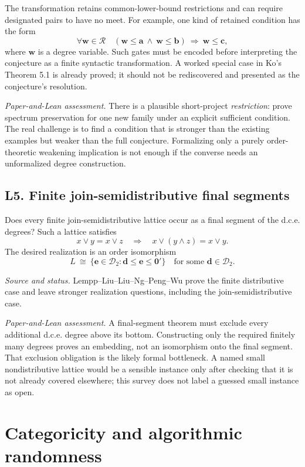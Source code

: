 \documentclass[11pt,a4paper]{article}
\newcommand{\D}{\mathcal D}
\newcommand{\R}{\mathcal R}
\newcommand{\onejump}{\mathbf0'}
\newcommand{\adeg}{\mathbf a}\newcommand{\bdeg}{\mathbf b}
\newcommand{\cdeg}{\mathbf c}\newcommand{\ddeg}{\mathbf d}
\newcommand{\edeg}{\mathbf e}\newcommand{\wedgeword}{\mathbf w}
\newcommand{\status}[1]{\par\noindent\textit{Source and status.} #1\par}
\newcommand{\assessment}[1]{\par\noindent\textit{Paper-and-Lean assessment.} #1\par}
\theoremstyle{definition}\newtheorem{definition}[theorem]{Definition}
\theoremstyle{remark}\newtheorem{remark}[theorem]{Remark}
\begin{document}
The transformation retains common-lower-bound restrictions and can require designated pairs to have no meet. For example, one kind of retained condition has the form
\[
 \forall\wedgeword\in\R\quad
   (\wedgeword\leq\adeg\ \land\ \wedgeword\leq\bdeg)
          \ \Longrightarrow\ \wedgeword\leq\cdeg,
\]
where $\wedgeword$ is a degree variable. Such gates must be encoded before interpreting the conjecture as a finite syntactic transformation. A worked special case in Ko's Theorem 5.1 is already proved; it should not be rediscovered and presented as the conjecture's resolution.\cite{Ko}

\assessment{There is a plausible short-project \emph{restriction}: prove spectrum preservation for one new family under an explicit sufficient condition. The real challenge is to find a condition that is stronger than the existing examples but weaker than the full conjecture. Formalizing only a purely order-theoretic weakening implication is not enough if the converse needs an unformalized degree construction.}

\subsection{L5. Finite join-semidistributive final segments \Lmark}
\label{entry:L5}

Does every finite join-semidistributive lattice occur as a final segment of the d.c.e. degrees? Such a lattice satisfies
\[
 x\vee y=x\vee z\quad\Longrightarrow\quad
 x\vee(y\wedge z)=x\vee y.
\]
The desired realization is an order isomorphism
\[
 L\ \cong\ \{\edeg\in\D_2:\ddeg\leq\edeg\leq\onejump\}
 \quad\text{for some }\ddeg\in\D_2.
\]
\status{Lempp--Liu--Liu--Ng--Peng--Wu prove the finite distributive case and leave stronger realization questions, including the join-semidistributive case.\cite{DCE}}

\assessment{A final-segment theorem must exclude every additional d.c.e. degree above its bottom. Constructing only the required finitely many degrees proves an embedding, not an isomorphism onto the final segment. That exclusion obligation is the likely formal bottleneck. A named small nondistributive lattice would be a sensible instance only after checking that it is not already covered elsewhere; this survey does not label a guessed small instance as open.}



\section{Categoricity and algorithmic randomness}
\label{sec:other}
\end{document}
